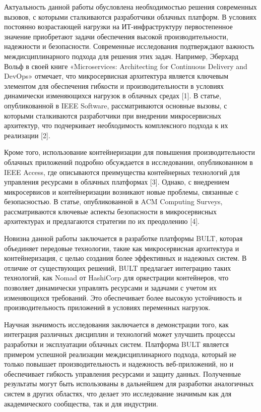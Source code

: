 \documentclass[
]{article}
\begin{document}
Актуальность данной работы обусловлена необходимостью решения
современных вызовов, с которыми сталкиваются разработчики облачных
платформ. В условиях постоянно возрастающей нагрузки на
ИТ-инфраструктуру первостепенное значение приобретают задачи обеспечения
высокой производительности, надежности и безопасности. Современные
исследования подтверждают важность междисциплинарного подхода для
решения этих задач. Например, Эберхард Вольф в своей книге
«Microservices: Architecting for Continuous Delivery and DevOps»
отмечает, что микросервисная архитектура является ключевым элементом для
обеспечения гибкости и производительности в условиях динамически
изменяющихся нагрузок в облачных средах {[}1{]}. В статье,
опубликованной в IEEE Software, рассматриваются основные вызовы, с
которыми сталкиваются разработчики при внедрении микросервисных
архитектур, что подчеркивает необходимость комплексного подхода к их
реализации {[}2{]}.

Кроме того, использование контейнеризации для повышения
производительности облачных приложений подробно обсуждается в
исследовании, опубликованном в IEEE Access, где описываются преимущества
контейнерных технологий для управления ресурсами в облачных платформах
{[}3{]}. Однако, с внедрением микросервисов и контейнеризации возникают
новые проблемы, связанные с безопасностью. В статье, опубликованной в
ACM Computing Surveys, рассматриваются ключевые аспекты безопасности в
микросервисных архитектурах и предлагаются стратегии по их преодолению
{[}4{]}.

Новизна данной работы заключается в разработке платформы BULT, которая
объединяет передовые технологии, такие как микросервисная архитектура и
контейнеризация, с целью создания более эффективных и надежных систем. В
отличие от существующих решений, BULT предлагает интеграцию таких
технологий, как Nomad от HashiCorp для оркестрации контейнеров, что
позволяет динамически управлять ресурсами и задачами с учетом их
изменяющихся требований. Это обеспечивает более высокую устойчивость и
производительность приложений в условиях переменных нагрузок.

Научная значимость исследования заключается в демонстрации того, как
интеграция различных дисциплин и технологий может улучшить процессы
разработки и эксплуатации облачных систем. Платформа BULT является
примером успешной реализации междисциплинарного подхода, который не
только повышает производительность и надежность веб-приложений, но и
обеспечивает гибкость управления ресурсами и защиту данных. Полученные
результаты могут быть использованы в дальнейшем для разработки
аналогичных систем в других областях, что делает это исследование
значимым как для академического сообщества, так и для индустрии.
\end{document}

